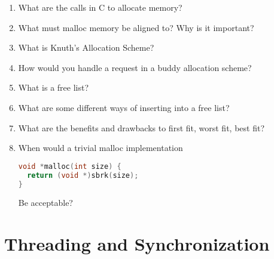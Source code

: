 \begin{enumerate}
\item What are the calls in C to allocate memory?
\item What must malloc memory be aligned to? Why is it important?
\item What is Knuth's Allocation Scheme?
\item How would you handle a request in a buddy allocation scheme?
\item What is a free list?
\item What are some different ways of inserting into a free list?
\item What are the benefits and drawbacks to first fit, worst fit, best fit?
\item When would a trivial malloc implementation
\begin{lstlisting}[language=C]
void *malloc(int size) {
  return (void *)sbrk(size);
}
\end{lstlisting}
Be acceptable?
\end{enumerate}

\section{Threading and Synchronization}


